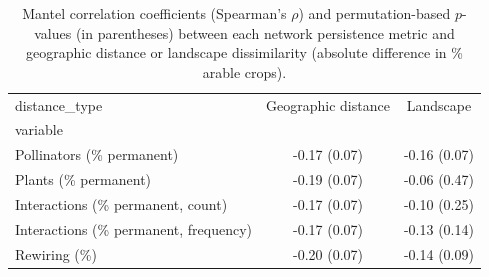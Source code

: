 \begin{table}
\centering
\caption{Mantel correlation coefficients (Spearman's $\rho$) and permutation-based $p$-values (in parentheses) between each network persistence metric and geographic distance or landscape dissimilarity (absolute difference in \% arable crops).}
\label{tab:mantel_results}
\begin{tabular}{lcc}
\toprule
distance_type & Geographic distance &     Landscape \\
variable                               &                     &               \\
\midrule
Pollinators (\% permanent)             &        -0.17 (0.07) &  -0.16 (0.07) \\
Plants (\% permanent)                  &        -0.19 (0.07) &  -0.06 (0.47) \\
Interactions (\% permanent, count)     &        -0.17 (0.07) &  -0.10 (0.25) \\
Interactions (\% permanent, frequency) &        -0.17 (0.07) &  -0.13 (0.14) \\
Rewiring (\%)                          &        -0.20 (0.07) &  -0.14 (0.09) \\
\bottomrule
\end{tabular}
\end{table}
